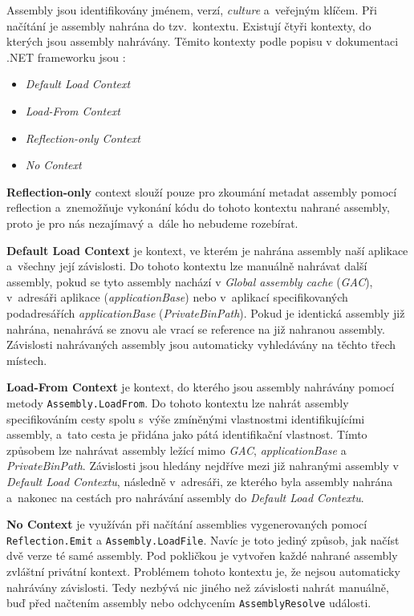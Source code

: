 Assembly jsou identifikovány jménem, verzí, \textit{culture} a~veřejným klíčem. 
Při načítání je assembly nahrána do tzv.~kontextu. Existují čtyři kontexty, do kterých jsou assembly nahrávány. Těmito kontexty podle popisu v dokumentaci .NET frameworku jsou \citep{site:assemblyload}:
\begin{itemize}
	\item \textit{Default Load Context}
	\item \textit{Load-From Context}
	\item \textit{Reflection-only Context}
	\item \textit{No Context}
\end{itemize}

\textbf{Reflection-only} context slouží pouze pro zkoumání metadat assembly pomocí reflection a~znemožňuje vykonání kódu do tohoto kontextu nahrané assembly, proto je pro nás nezajímavý a~dále ho nebudeme rozebírat.

\textbf{Default Load Context} je kontext, ve kterém je nahrána assembly naší aplikace a~všechny její závislosti. Do tohoto kontextu lze manuálně nahrávat další assembly, pokud se tyto assembly nachází v \textit{Global assembly cache} (\emph{GAC}), v~adresáři aplikace (\textit{applicationBase}) nebo v~aplikací specifikovaných podadresářích \textit{applicationBase} (\textit{PrivateBinPath}). Pokud je identická assembly již nahrána, nenahrává se znovu ale vrací se reference na již nahranou assembly. Závislosti nahrávaných assembly jsou automaticky vyhledávány na těchto třech místech.

\textbf{Load-From Context} je kontext, do kterého jsou assembly nahrávány pomocí metody \texttt{Assembly.LoadFrom}. Do tohoto kontextu lze nahrát assembly specifikováním cesty spolu s~výše zmíněnými vlastnostmi identifikujícími assembly, a~tato cesta je přidána jako pátá identifikační vlastnost. Tímto způsobem lze nahrávat assembly ležící mimo \emph{GAC}, \textit{applicationBase} a \textit{PrivateBinPath}. Závislosti jsou hledány nejdříve mezi již nahranými assembly v \textit{Default Load Contextu}, následně v~adresáři, ze kterého byla assembly nahrána a~nakonec na cestách pro nahrávání assembly do \textit{Default Load Contextu}.

\textbf{No Context} je využíván při načítání  assemblies vygenerovaných pomocí \texttt{Reflection.Emit} a \texttt{Assembly.LoadFile}. Navíc je toto jediný způsob, jak načíst dvě verze té samé assembly. Pod pokličkou je vytvořen každé nahrané assembly zvláštní privátní kontext. Problémem tohoto kontextu je, že nejsou automaticky nahrávány závislosti. Tedy nezbývá nic jiného než závislosti nahrát manuálně, buď před načtením assembly nebo odchycením \texttt{AssemblyResolve} události.

